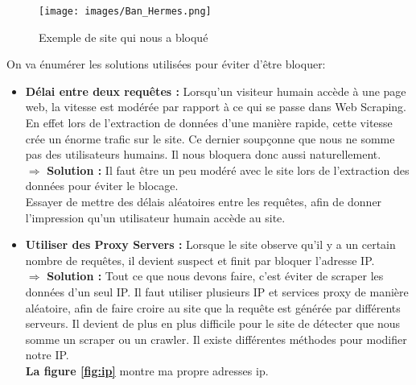     \begin{figure}[H]
            \centering
            \texttt{[image: images/Ban\_Hermes.png]}
            \caption{Exemple de site qui nous a bloqué}
            \label{fig:BanH}  
        \end{figure}
    On va énumérer les solutions utilisées pour éviter d’être bloquer:
     \begin{itemize}[label=,font=\normalsize]
            \addtolength{\itemindent}{0cm}
            \item\textbf{Délai entre deux requêtes :} Lorsqu'un visiteur humain accède à une page web, la vitesse est modérée par rapport à ce qui se passe dans Web Scraping. En effet lors de l’extraction de données d’une manière rapide, cette vitesse crée un énorme trafic sur le site.
            Ce dernier soupçonne que nous ne somme pas des utilisateurs humains. Il nous bloquera donc aussi naturellement.\\
            $\Rightarrow$ \textbf{Solution :} Il faut être un peu modéré avec le site lors de l’extraction des données pour éviter le blocage.\\ 
            Essayer de mettre des délais aléatoires entre les requêtes, afin de donner l’impression qu'un utilisateur humain accède au site.
            \item\textbf{Utiliser des Proxy Servers :} Lorsque le site observe qu'il y a un certain nombre de requêtes, il devient suspect et finit par bloquer l'adresse IP.\\
            $\Rightarrow$ \textbf{Solution :} Tout ce que nous devons faire, c'est éviter de scraper les données d'un seul IP. Il faut utiliser plusieurs IP et services proxy de manière aléatoire, afin de faire croire au site que la requête est générée par différents serveurs. Il devient de plus en plus difficile pour le site de détecter que nous somme un scraper ou un crawler. Il existe différentes méthodes pour modifier notre IP.\\
            \textbf{La figure \ref{fig:ip}} montre ma propre adresses ip.
            

\end{itemize}
